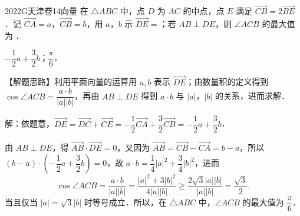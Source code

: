 
\begin{problem}{2022}{G}{天津卷}{14}{向量}
在 $\triangle ABC$ 中，点 $D$ 为 $AC$ 的中点，点 $E$ 满足 $\overrightarrow{CB}=2\overrightarrow{BE}$．记 $\overrightarrow{CA}=a$，$\overrightarrow{CB}=b$，用 $a$，$b$ 示 $\overrightarrow{DE}=$\underline{\hspace{4em}}；若 $AB\perp DE$，则 $\angle ACB$ 的最大值为 \underline{\hspace{4em}}．
\end{problem}

\begin{answer}
$-\dfrac{1}{2}a+\dfrac{3}{2}b$；$\dfrac{\pi}{6}$．
\end{answer}

\begin{solutions}
【解题思路】利用平面向量的运算用 $a,b$ 表示 $\overrightarrow{DE}$；由数量积的定义得到 $\cos\angle ACB=\dfrac{a\cdot b}{|a||b|}$，再由 $AB\perp DE$ 得到 $a\cdot b$ 与 $|a|$，$|b|$ 的关系，进而求解．

解：依题意，$\overrightarrow{DE}=\overrightarrow{DC}+\overrightarrow{CE}=-\dfrac{1}{2}\overrightarrow{CA}+\dfrac{3}{2}\overrightarrow{CB}=-\dfrac{1}{2}a+\dfrac{3}{2}b$．

由 $AB\perp DE$，得 $\overrightarrow{AB}\cdot\overrightarrow{DE}=0$，又因为 $\overrightarrow{AB}=\overrightarrow{CB}-\overrightarrow{CA}=b-a$，所以 $(b-a)\cdot\left(-\dfrac{1}{2}a+\dfrac{3}{2}b\right)=0$，故 $a\cdot b=\dfrac{1}{4}|a|^2+\dfrac{3}{4}|b|^2$，进而
$$
\cos\angle ACB=\dfrac{a\cdot b}{|a||b|}=\dfrac{|a|^2+3|b|^2}{4|a||b|}\geqslant\dfrac{2\sqrt{3}|a||b|}{|a||b|}=\dfrac{\sqrt{3}}{2}.
$$
当且仅当 $|a|=\sqrt{3}|b|$ 时等号成立．所以，在 $\triangle ABC$ 中，$\angle ACB$ 的最大值为 $\dfrac{\pi}{6}$．
\end{solutions}